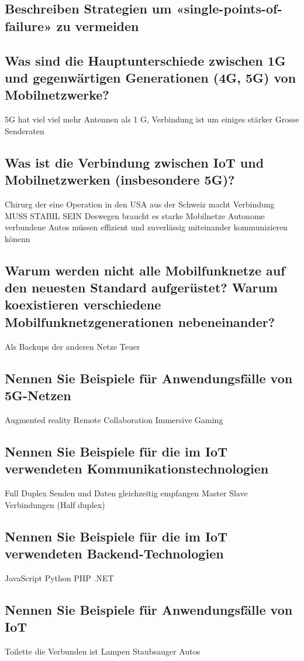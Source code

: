 \subsection*{Beschreiben Strategien um «single-points-of-failure» zu vermeiden}

\subsection*{Was sind die Hauptunterschiede zwischen 1G und gegenwärtigen Generationen (4G, 5G) von Mobilnetzwerke?}
5G hat viel viel mehr Antennen als 1 G, Verbindung ist um einiges stärker
Grosse Senderaten
\subsection*{Was ist die Verbindung zwischen IoT und Mobilnetzwerken (insbesondere 5G)?}
Chirurg der eine Operation in den USA aus der Schweiz macht
Verbindung MUSS STABIL SEIN
Deswegen braucht es starke Mobilnetze
Autonome verbundene Autos müssen effizient und zuverlässig miteinander kommunizieren könenn

\subsection*{Warum werden nicht alle Mobilfunknetze auf den neuesten Standard aufgerüstet? Warum koexistieren verschiedene Mobilfunknetzgenerationen nebeneinander?}
Als Backups der anderen Netze
Teuer

\subsection*{Nennen Sie Beispiele für Anwendungsfälle von 5G-Netzen}
Augmented reality
Remote Collaboration
Immersive Gaming

\subsection*{Nennen Sie Beispiele für die im IoT verwendeten Kommunikationstechnologien}
Full Duplex
Senden und Daten gleichzeitig empfangen
Master Slave Verbindungen (Half duplex) 


\subsection*{Nennen Sie Beispiele für die im IoT verwendeten Backend-Technologien}
JavaScript
Python
PHP
.NET

\subsection*{Nennen Sie Beispiele für Anwendungsfälle von IoT}
Toilette die Verbunden ist
Lampen
Staubsauger
Autos

